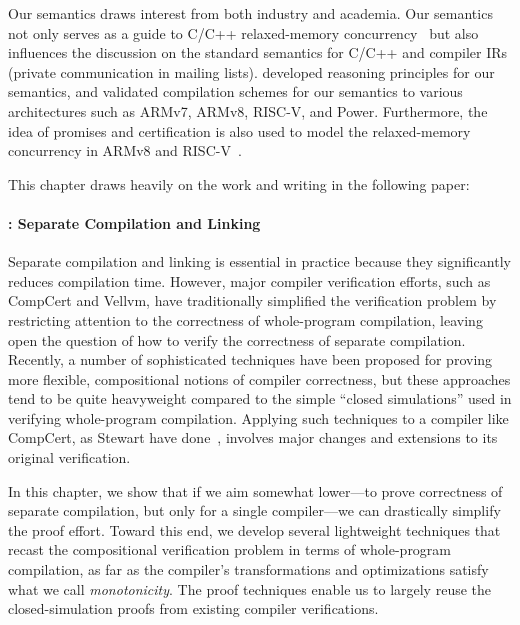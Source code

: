 Our semantics draws interest from both industry and academia.  Our semantics not only serves as a
guide to C/C++ relaxed-memory concurrency~\cite{blog,niko} but also influences the discussion on the
standard semantics for C/C++ and compiler IRs (private communication in mailing lists).
\cite{viktor-logic} developed reasoning principles for our semantics, and \cite{viktor-compilation}
validated compilation schemes for our semantics to various architectures such as ARMv7, ARMv8,
RISC-V, and Power.  Furthermore, the idea of promises and certification is also used to model the
relaxed-memory concurrency in ARMv8 and RISC-V~\cite{promising-armv8-riscv}.

This chapter draws heavily on the work and writing in the following paper:



\paragraph{: Separate Compilation and Linking}

Separate compilation and linking is essential in practice because they significantly reduces
compilation time.  However, major compiler verification efforts, such as CompCert and Vellvm, have
traditionally simplified the verification problem by restricting attention to the correctness of
whole-program compilation, leaving open the question of how to verify the correctness of separate
compilation.  Recently, a number of sophisticated techniques have been proposed for proving more
flexible, compositional notions of compiler correctness, but these approaches tend to be quite
heavyweight compared to the simple ``closed simulations'' used in verifying whole-program
compilation.  Applying such techniques to a compiler like CompCert, as Stewart \etal{} have
done~\cite{compositional-compcert}, involves major changes and extensions to its original
verification.

In this chapter, we show that if we aim somewhat lower---to prove correctness of separate
compilation, but only for a single compiler---we can drastically simplify the proof effort.  Toward
this end, we develop several lightweight techniques that recast the compositional verification
problem in terms of whole-program compilation, as far as the compiler's transformations and
optimizations satisfy what we call \emph{monotonicity}.  The proof techniques enable us to largely
reuse the closed-simulation proofs from existing compiler verifications.


